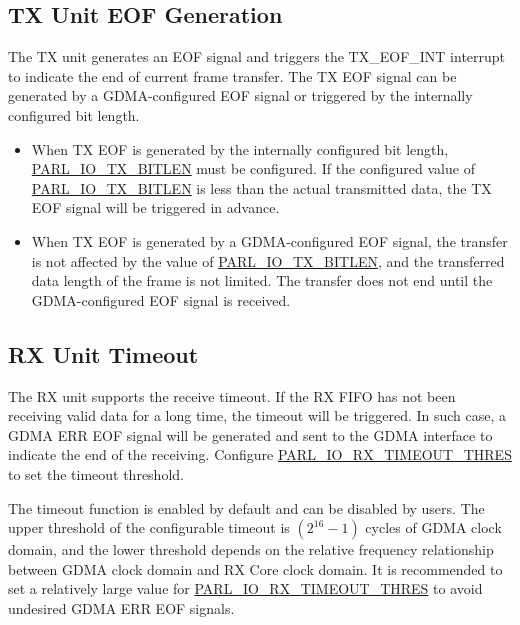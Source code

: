 \documentclass[main\_\_EN.tex]{subfiles}
\begin{document}
\subsection{TX Unit EOF Generation}

The TX unit generates an EOF signal and triggers the TX\_EOF\_INT interrupt to indicate the end of current frame transfer. The TX EOF signal can be generated by a GDMA-configured EOF signal or triggered by the internally configured bit length.

\begin{itemize}
    \item When TX EOF is generated by the internally configured bit length, \hyperref[fielddesc:PARLIOTXBITLEN]{PARL\_IO\_TX\_BITLEN} must be configured. If the configured value of \hyperref[fielddesc:PARLIOTXBITLEN]{PARL\_IO\_TX\_BITLEN} is less than the actual transmitted data, the TX EOF signal will be triggered in advance.
    \item When TX EOF is generated by a GDMA-configured EOF signal, the transfer is not affected by the value of \hyperref[fielddesc:PARLIOTXBITLEN]{PARL\_IO\_TX\_BITLEN}, and the transferred data length of the frame is not limited. The transfer does not end until the GDMA-configured EOF signal is received.
\end{itemize}

\subsection{RX Unit Timeout}

The RX unit supports the receive timeout. If the RX FIFO has not been receiving valid data for a long time, the timeout will be triggered. In such case, a GDMA ERR EOF signal will be generated and sent to the GDMA interface to indicate the end of the receiving. Configure \hyperref[fielddesc:PARLIORXTIMEOUTTHRES]{PARL\_IO\_RX\_TIMEOUT\_THRES} to set the timeout threshold.

The timeout function is enabled by default and can be disabled by users. The upper threshold of the configurable timeout is \begin{math} (2^{16}-1) \end{math} cycles of GDMA clock domain, and the lower threshold depends on the relative frequency relationship between GDMA clock domain and RX Core clock domain. It is recommended to set a relatively large value for \hyperref[fielddesc:PARLIORXTIMEOUTTHRES]{PARL\_IO\_RX\_TIMEOUT\_THRES} to avoid undesired GDMA ERR EOF signals.
\end{document}
